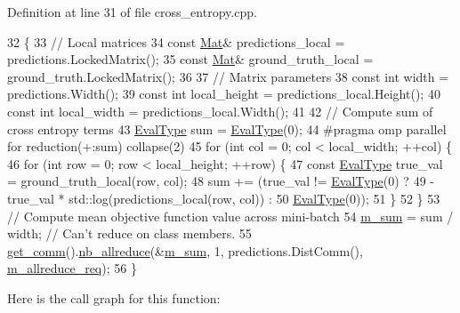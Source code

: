 Definition at line 31 of file cross\+\_\+entropy.\+cpp.


\begin{DoxyCode}
32                                                                            \{
33   \textcolor{comment}{// Local matrices}
34   \textcolor{keyword}{const} \hyperlink{base_8hpp_a68f11fdc31b62516cb310831bbe54d73}{Mat}& predictions\_local = predictions.LockedMatrix();
35   \textcolor{keyword}{const} \hyperlink{base_8hpp_a68f11fdc31b62516cb310831bbe54d73}{Mat}& ground\_truth\_local = ground\_truth.LockedMatrix();
36   
37   \textcolor{comment}{// Matrix parameters}
38   \textcolor{keyword}{const} \textcolor{keywordtype}{int} width = predictions.Width();
39   \textcolor{keyword}{const} \textcolor{keywordtype}{int} local\_height = predictions\_local.Height();
40   \textcolor{keyword}{const} \textcolor{keywordtype}{int} local\_width = predictions\_local.Width();
41 
42   \textcolor{comment}{// Compute sum of cross entropy terms}
43   \hyperlink{base_8hpp_a3266f5ac18504bbadea983c109566867}{EvalType} sum = \hyperlink{base_8hpp_a3266f5ac18504bbadea983c109566867}{EvalType}(0);
44 \textcolor{preprocessor}{  #pragma omp parallel for reduction(+:sum) collapse(2)}
45   \textcolor{keywordflow}{for} (\textcolor{keywordtype}{int} col = 0; col < local\_width; ++col) \{
46     \textcolor{keywordflow}{for} (\textcolor{keywordtype}{int} row = 0; row < local\_height; ++row) \{
47       \textcolor{keyword}{const} \hyperlink{base_8hpp_a3266f5ac18504bbadea983c109566867}{EvalType} true\_val = ground\_truth\_local(row, col);
48       sum += (true\_val != \hyperlink{base_8hpp_a3266f5ac18504bbadea983c109566867}{EvalType}(0) ?
49               - true\_val * std::log(predictions\_local(row, col)) :
50               \hyperlink{base_8hpp_a3266f5ac18504bbadea983c109566867}{EvalType}(0));
51     \}
52   \}
53   \textcolor{comment}{// Compute mean objective function value across mini-batch}
54   \hyperlink{classlbann_1_1cross__entropy_a0eea3d755b963149cb364e722a7352d8}{m\_sum} = sum / width;  \textcolor{comment}{// Can't reduce on class members.}
55   \hyperlink{classlbann_1_1objective__function__term_a5f89b676a26a6b76ddc26563ac87beb9}{get\_comm}().\hyperlink{classlbann_1_1lbann__comm_a2a7bb6cf3707366fc0671d8894ca30ea}{nb\_allreduce}(&\hyperlink{classlbann_1_1cross__entropy_a0eea3d755b963149cb364e722a7352d8}{m\_sum}, 1, predictions.DistComm(), 
      \hyperlink{classlbann_1_1cross__entropy_a982d913d892cd9043325e2cc6a77f039}{m\_allreduce\_req});
56 \}
\end{DoxyCode}
Here is the call graph for this function\+:\nopagebreak

